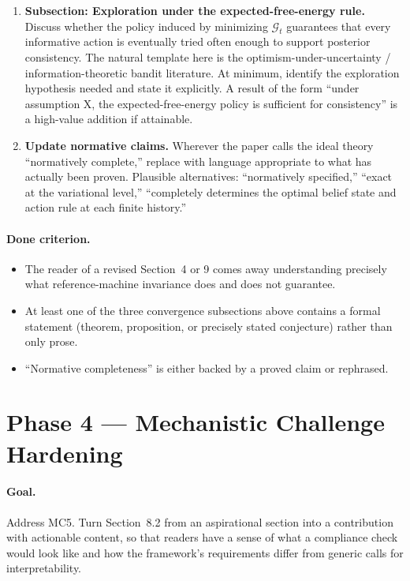 \documentclass[11pt]{article}
\begin{document}
\begin{enumerate}[leftmargin=*]
If a full theorem is not feasible within the revision, present the discussion as a \emph{conjecture with evidence}: state the claim precisely, sketch what a proof would require, and cite the Solomonoff-sequence analogue.
\item \textbf{Subsection: Exploration under the expected-free-energy rule.} Discuss whether the policy induced by minimizing $\mathcal{G}_t$ guarantees that every informative action is eventually tried often enough to support posterior consistency. The natural template here is the optimism-under-uncertainty / information-theoretic bandit literature. At minimum, identify the exploration hypothesis needed and state it explicitly. A result of the form ``under assumption X, the expected-free-energy policy is sufficient for consistency'' is a high-value addition if attainable.
\item \textbf{Update normative claims.} Wherever the paper calls the ideal theory ``normatively complete,'' replace with language appropriate to what has actually been proven. Plausible alternatives: ``normatively specified,'' ``exact at the variational level,'' ``completely determines the optimal belief state and action rule at each finite history.''
\end{enumerate}

\paragraph{Done criterion.}
\begin{itemize}[leftmargin=*]
\item The reader of a revised Section~4 or 9 comes away understanding precisely what reference-machine invariance does and does not guarantee.
\item At least one of the three convergence subsections above contains a formal statement (theorem, proposition, or precisely stated conjecture) rather than only prose.
\item ``Normative completeness'' is either backed by a proved claim or rephrased.
\end{itemize}

\section{Phase 4 --- Mechanistic Challenge Hardening}
\label{sec:phase4}

\paragraph{Goal.} Address MC5. Turn Section~8.2 from an aspirational section into a contribution with actionable content, so that readers have a sense of what a compliance check would look like and how the framework's requirements differ from generic calls for interpretability.
\end{document}
